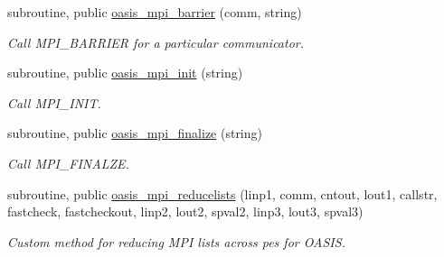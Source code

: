 \begin{DoxyCompactItemize}
subroutine, public \hyperlink{classmod__oasis__mpi_aaf477847380fbbbc1341520b0b3e66da}{oasis\+\_\+mpi\+\_\+barrier} (comm, string)
\begin{DoxyCompactList}\small\item\em Call M\+P\+I\+\_\+\+B\+A\+R\+R\+I\+E\+R for a particular communicator. \end{DoxyCompactList}\item 
subroutine, public \hyperlink{classmod__oasis__mpi_aaf45f20e0000b32e71ec9ea8e806f57c}{oasis\+\_\+mpi\+\_\+init} (string)
\begin{DoxyCompactList}\small\item\em Call M\+P\+I\+\_\+\+I\+N\+I\+T. \end{DoxyCompactList}\item 
subroutine, public \hyperlink{classmod__oasis__mpi_a0a601a3f718c0704db99a21b2c43fbcd}{oasis\+\_\+mpi\+\_\+finalize} (string)
\begin{DoxyCompactList}\small\item\em Call M\+P\+I\+\_\+\+F\+I\+N\+A\+L\+Z\+E. \end{DoxyCompactList}\item 
subroutine, public \hyperlink{classmod__oasis__mpi_a52ceb1f5d86efec2d94dcc7a18e90216}{oasis\+\_\+mpi\+\_\+reducelists} (linp1, comm, cntout, lout1, callstr, fastcheck, fastcheckout, linp2, lout2, spval2, linp3, lout3, spval3)
\begin{DoxyCompactList}\small\item\em Custom method for reducing M\+P\+I lists across pes for O\+A\+S\+I\+S. \end{DoxyCompactList}\end{DoxyCompactItemize}
